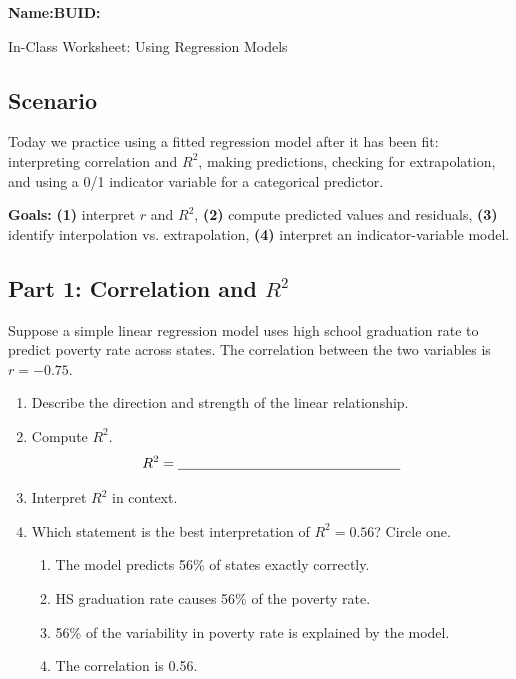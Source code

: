 \documentclass{article}
\newcommand{\blankline}[1]{\underline{\hspace{#1}}}
\begin{document}
\noindent\textbf{Name:}\blankline{2.25in}\hfill\textbf{BUID:}\blankline{1.55in}\newline

\begin{center}
 \Large In-Class Worksheet: Using Regression Models
\end{center}

\subsection*{Scenario}
Today we practice using a fitted regression model after it has been fit: interpreting correlation and $R^2$, making predictions, checking for extrapolation, and using a 0/1 indicator variable for a categorical predictor.

\medskip
\noindent\textbf{Goals:} \textbf{(1)} interpret $r$ and $R^2$, \textbf{(2)} compute predicted values and residuals, \textbf{(3)} identify interpolation vs. extrapolation, \textbf{(4)} interpret an indicator-variable model.

\subsection*{Part 1: Correlation and $R^2$}
Suppose a simple linear regression model uses high school graduation rate to predict poverty rate across states. The correlation between the two variables is $r=-0.75$.

\begin{enumerate}[label={\bfseries (\Alph*)},itemsep=.8em]
\item Describe the direction and strength of the linear relationship. \\[2.5em]
\item Compute $R^2$.
\[
R^2 = \blankline{2.2in}
\]
\item Interpret $R^2$ in context. \\[3.5em]
\item Which statement is the best interpretation of $R^2=0.56$? Circle one.
\begin{enumerate}[label=\arabic*.,itemsep=.2em]
\item The model predicts 56\% of states exactly correctly.
\item HS graduation rate causes 56\% of the poverty rate.
\item 56\% of the variability in poverty rate is explained by the model.
\item The correlation is 0.56.
\end{enumerate}
\end{enumerate}
\end{document}
